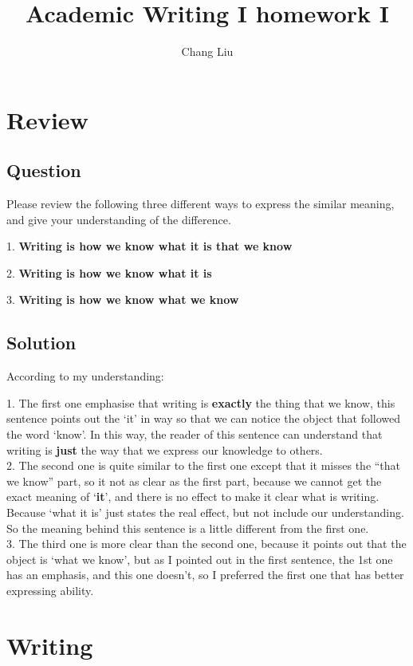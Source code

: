\documentclass{article}
\title{Academic Writing I homework I}
\author{Chang Liu}
\begin{document}
\maketitle

\section{Review}

\subsection{Question}
Please review the following three different ways to express the similar meaning, and give your understanding of the difference.

1. \textbf{Writing is how we know what it is that we know}

2. \textbf{Writing is how we know what it is}

3. \textbf{Writing is how we know what we know}

\subsection{Solution}
According to my understanding:

1. The first one emphasise that writing is \textbf{exactly} the thing that we know, this sentence points out the `it' in way so that we can notice
the object that followed the word `know'. In this way, the reader of this sentence can understand that writing is \textbf{just} the way that we express our knowledge to others.\\

2. The second one is quite similar to the first one except that it misses the ``that we know'' part, so it not as clear as the first part, because we cannot get the exact meaning of `\textbf{it}', and there is no effect to make it clear what is writing. Because `what it is' just states the real effect, but not include our understanding. So the meaning behind this sentence is a little different from the first one.\\

3. The third one is more clear than the second one, because it points out that the object is `what we know', but as I pointed out in the first sentence, the 1st one has an emphasis, and this one doesn't, so I preferred the first one that has better expressing ability.


\section{Writing}
\end{document}
